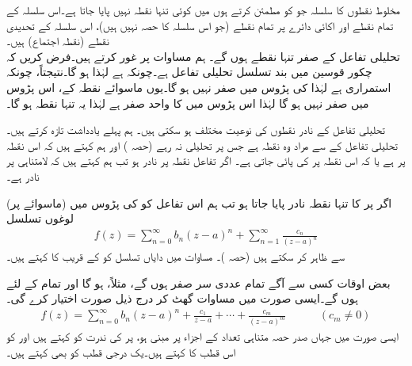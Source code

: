 مخلوط نقطوں  کا سلسلہ جو  کو مطمئن کرتے ہوں میں کوئی تنہا نقطہ نہیں پایا جاتا ہے۔اس سلسلہ کے تمام نقطے اور اکائی دائرے پر تمام نقطے (جو اس سلسلہ کا حصہ نہیں ہیں)، اس سلسلہ کے تحدیدی نقطے (نقطہ اجتماع) ہیں۔ 
\quad {}\\
تحلیلی تفاعل  کے صفر تنہا نقطے ہوں گے۔
\quad
ہم مساوات  پر غور کرتے ہیں۔فرض کریں کہ چکور قوسین میں بند تسلسل  تحلیلی تفاعل  ہے۔چونکہ  ہے لہٰذا  ہو گا۔نتیجتاً، چونکہ  استمراری ہے لہٰذا  کی پڑوس میں  صفر نہیں ہو گا۔یوں ماسوائے نقطہ  کے،   اس پڑوس میں صفر نہیں ہو گا لہٰذا اس پڑوس میں  کا واحد صفر ہے  لہٰذا یہ تنہا نقطہ ہو گا۔

تحلیلی تفاعل کے نادر نقطوں کی نوعیت مختلف ہو سکتی ہیں۔ ہم پہلے یادداشت تازہ کرتے ہیں۔ تحلیلی تفاعل  کے  سے مراد وہ نقطہ ہے جس پر  تحلیلی نہ رہے (حصہ ) اور ہم کہتے ہیں کہ اس نقطہ پر   ہے یا کہ اس نقطہ پر  کی  پائی جاتی ہے۔ اگر تفاعل  نقطہ  پر نادر ہو تب ہم کہتے ہیں کہ  لامتناہی پر نادر ہے۔

اگر  پر  کا تنہا نقطہ نادر پایا جاتا ہو تب ہم اس تفاعل کو  کی پڑوس میں (ماسوائے  پر) لوغوں تسلسل
\begin{align}\label{مساوات_ٹیلر_لوغوں_تنہا_نقطہ_نادر_الف}
f(z)=\sum\limits_{n=0}^{\infty} b_n(z-a)^n+\sum\limits_{n=1}^{\infty} \frac{c_n}{(z-a)^n}
\end{align}
سے ظاہر کر سکتے ہیں (حصہ )۔ مساوات  میں دایاں تسلسل کو  کے قریب  کا  کہتے ہیں۔

بعض اوقات کسی  سے آگے تمام عددی سر  صفر ہوں گے، مثلاً،  ہو گا اور تمام  کے لئے  ہوں گے۔ایسی صورت میں مساوات  گھٹ کر درج ذیل صورت اختیار کرے گی۔
\begin{align}\label{مساوات_ٹیلر_لوغوں_تنہا_نقطہ_نادر_ب}
f(z)=\sum\limits_{n=0}^{\infty} b_n(z-a)^n+\frac{c_1}{z-a}+\cdots+\frac{c_m}{(z-a)^m}\quad \quad\quad (c_m\ne 0)
\end{align}  
ایسی صورت میں جہاں صدر حصہ متناہی تعداد کے اجزاء پر مبنی ہو،  پر  کی ندرت کو  کہتے ہیں اور  کو اس قطب کا  کہتے ہیں۔یک درجی قطب کو  بھی کہتے ہیں۔

